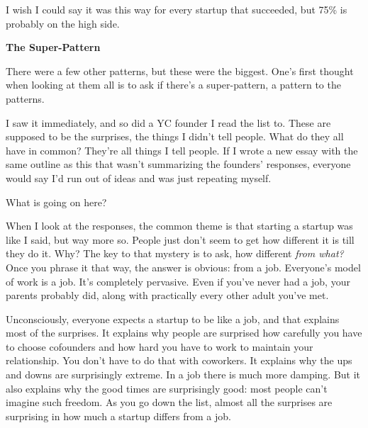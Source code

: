                   I wish I could say it was this way for every startup that
                  succeeded, but 75\% is probably on the high side.


                  \textbf{The Super-Pattern}

There were a few other
                  patterns, but these were the biggest. One's first thought when
                  looking at them all is to ask if there's a super-pattern, a
                  pattern to the patterns.

I saw it immediately, and
                  so did a YC founder I read the list to. These are supposed to
                  be the surprises, the things I didn't tell people. What do
                  they all have in common? They're all things I tell people. If
                  I wrote a new essay with the same outline as this that wasn't
                  summarizing the founders' responses, everyone would say I'd
                  run out of ideas and was just repeating myself.

What
                  is going on here?

When I look at the responses, the
                  common theme is that starting a startup was like I said, but
                  way more so. People just don't seem to get how different it is
                  till they do it. Why? The key to that mystery is to ask, how
                  different \emph{from what?} Once you phrase it that way, the
                  answer is obvious: from a job. Everyone's model of work is a
                  job. It's completely pervasive. Even if you've never had a
                  job, your parents probably did, along with practically every
                  other adult you've met.

Unconsciously, everyone
                  expects a startup to be like a job, and that explains most of
                  the surprises. It explains why people are surprised how
                  carefully you have to choose cofounders and how hard you have
                  to work to maintain your relationship. You don't have to do
                  that with coworkers. It explains why the ups and downs are
                  surprisingly extreme. In a job there is much more damping. But
                  it also explains why the good times are surprisingly good:
                  most people can't imagine such freedom. As you go down the
                  list, almost all the surprises are surprising in how much a
                  startup differs from a job.

